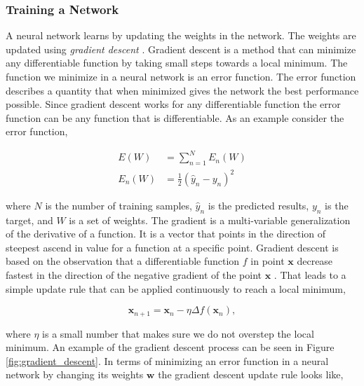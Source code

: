 \subsubsection{Training a Network} \label{subsubsec:training_a_network}

A neural network learns by updating the weights in the network. The weights are
updated using \textit{gradient descent} \citep{Bishop}. Gradient descent is
a method that can minimize any differentiable function by taking small steps
towards a local minimum. The function we minimize in a neural network is an
error function. The error function describes a quantity that when minimized
gives the network the best performance possible. Since gradient descent works
for any differentiable function the error function can be any function that is
differentiable. As an example consider the error function,

\begin{align}
    E(W)   &= \sum_{n=1}^{N} E_n(W) \\
    E_n(W) &= \frac{1}{2} \left( \hat{y}_n - y_n \right)^2
\end{align}

where $N$ is the number of training samples, $\hat{y}_n$ is the predicted
results, $y_n$ is the target, and $W$ is a set of weights. The gradient is
a multi-variable generalization of the derivative of a function. It is a
vector that points in the direction of steepest ascend in value for a function
at a specific point. Gradient descent is based on the observation that a
differentiable function $f$ in point $\mathbf{x}$ decrease fastest in the
direction of the negative gradient of the point $\mathbf{x}$ \citep{Bishop}.
That leads to a simple update rule that can be applied continuously to reach a
local minimum,

\begin{equation}
    \mathbf{x}_{n+1} = \mathbf{x}_n - \eta \Delta f\left(\mathbf{x}_n\right),
\end{equation}

where $\eta$ is a small number that makes sure we do not overstep the local
minimum. An example of the gradient descent process can be seen in Figure
\ref{fig:gradient_descent}. In terms of minimizing an error function in a neural
network by changing its weights $\mathbf{w}$ the gradient descent update rule
looks like,

